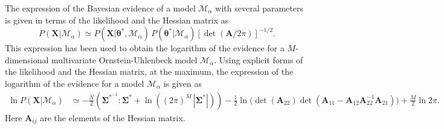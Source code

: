 \documentclass[english,aps, twocolumn, pre,superscriptaddress, notitlepage]{revtex4-1}
\begin{document}
The expression of the Bayesian evidence of a model $\mathcal{M}_{\alpha}$
with several parameters is given in terms of the likelihood and the
Hessian matrix as \cite{mackay2003information}
\begin{equation}
P(\boldsymbol{X}|\mathcal{M}_{\alpha})\simeq P(\boldsymbol{X}|\boldsymbol{\theta}^{\ast},\mathcal{M}_{\alpha})\,P(\boldsymbol{\theta}^{\ast}|\mathcal{M}_{\alpha})[\det(\bm{A}/2\pi)]^{-1/2}.\label{eq:evidence-multivariate-1}
\end{equation}
This expression has been used to obtain the logarithm of the evidence
for a $M$-dimensional multivariate Ornstein-Uhlenbeck model $\mathcal{M}_{\alpha}$.
Using explicit forms of the likelihood and the Hessian matrix, at
the maximum, the expression of the logarithm of the evidence for a
model $\mathcal{M}_{\alpha}$ is given as
\begin{align}
\ln P\left(\bm{X}|\mathcal{M}_{\alpha}\right) & \simeq-\frac{N}{2}\left(\bm{\Sigma}^{*^{-1}}:\bm{\Sigma}^{*}+\ln((2\pi)^{M}\,|\bm{\Sigma}^{*}|)\right)-\frac{1}{2}\ln\Big(\det(\boldsymbol{A}_{22})\det(\boldsymbol{A}_{11}-\boldsymbol{A}_{12}\boldsymbol{A}_{22}^{-1}\boldsymbol{A}_{21})\Big)+\tfrac{M}{2}\ln2\pi.
\end{align}
Here $\boldsymbol{A}_{ij}$ are the elements of the Hessian matrix.
%
%
\end{document}
